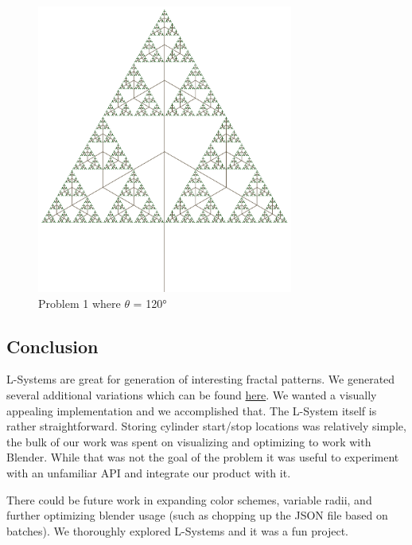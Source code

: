 \begin{figure}[H]
\centering
\noindent\includegraphics[width=0.75\textwidth]{figures/L-systems/prob1-120}
\caption{Problem 1 where $\theta$ = 120°}
\label{fig:prob1_120}
\end{figure}




\subsection{Conclusion}
L-Systems are great for generation of interesting fractal patterns. We 
generated several additional variations which can be found 
\href{https://sketchfab.com/macattackftw/models}{here}. We wanted a visually 
appealing implementation and we accomplished that. The L-System itself is 
rather straightforward. Storing cylinder start/stop locations was relatively 
simple, the bulk of our work was spent on visualizing and optimizing to work 
with Blender. While that was not the goal of the problem it was useful to 
experiment with an unfamiliar API and integrate our product with it. 

There could be future work in expanding color schemes, variable radii, and 
further optimizing blender usage (such as chopping up the JSON file based on 
batches). We thoroughly explored L-Systems and it was a fun project.